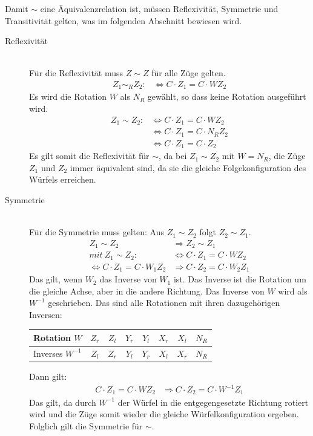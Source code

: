 \documentclass[12pt,a4paper, usenames, dvipsnames]{article}
\theoremstyle{mystyle}
\theoremstyle{definition}
\begin{document}
Damit $\sim$ eine Äquivalenzrelation ist, müssen Reflexivität, Symmetrie und Transitivität gelten, was im folgenden Abschnitt bewiesen wird.

\begin{description}


\item [Reflexivität] \ \\
Für die Reflexivität muss $Z \sim Z$ für alle Züge gelten. 
\begin{align*}
Z_1 \sim_R Z_2 : & \Leftrightarrow C \cdot Z_1 = C \cdot WZ_2
\end{align*}
Es wird die Rotation $W$ als $N_R$ gewählt, so dass keine Rotation ausgeführt wird.
\begin{align*}
Z_1 \sim Z_2 : & \Leftrightarrow  C \cdot Z_1 = C \cdot WZ_2 \\
\ & \Leftrightarrow C \cdot Z_1=C \cdot N_R Z_2 \\
\ & \Leftrightarrow C \cdot Z_1 = C \cdot Z_2
\end{align*}
Es gilt somit die Reflexivität für $\sim$, da bei $Z_1 \sim Z_2$ mit $W=N_R$, die Züge $Z_1$ und $Z_2$ immer äquivalent sind, da sie die gleiche Folgekonfiguration des Würfels erreichen.

\item [Symmetrie] \ \\
Für die Symmetrie muss gelten: Aus $Z_1 \sim Z_2$ folgt $Z_2 \sim Z_1$.
\begin{align*}
Z_1 \sim Z_2 & \Rightarrow Z_2 \sim Z_1 \\
mit \ Z_1 \sim Z_2 : & \Leftrightarrow  C \cdot  Z_1 = C \cdot  WZ_2 \\
\Leftrightarrow C \cdot  Z_1 = C \cdot  W_1 Z_2 & \Rightarrow C \cdot  Z_2 = C \cdot  W_2 Z_1
\end{align*}
Das gilt, wenn $W_2$ das Inverse von $W_1$ ist. Das Inverse ist die Rotation um die gleiche Achse, aber in die andere Richtung. 
Das Inverse von $W$ wird als $W^{-1}$ geschrieben.
Das sind alle Rotationen mit ihren dazugehörigen Inversen:

\begin{center}
\begin{tabular}{lccccccc}
Rotation $W$ & ${Z_r}$ & ${Z_l}$ &  ${Y_r}$ & ${Y_l}$ & ${X_r}$ & ${X_l}$ & $N_R$ \\
\hline
Inverses \hspace*{0.1em} $W^{-1}$ & ${Z_l}$ & ${Z_r}$ &  ${Y_l}$ & ${Y_r}$ & ${X_l}$ & ${X_r}$ & $N_R$ \\
\end{tabular} 
\end{center}
Dann gilt: 
\begin{align*}
C \cdot  Z_1 = C \cdot  W Z_2 & \Rightarrow C \cdot  Z_2 = C \cdot  W^{-1} Z_1
\end{align*}
Das gilt, da durch $W^{-1}$ der Würfel in die entgegengesetzte Richtung rotiert wird und die Züge somit wieder die gleiche Würfelkonfiguration ergeben.
Folglich gilt die Symmetrie für $\sim$.



\end{description}
\end{document}
